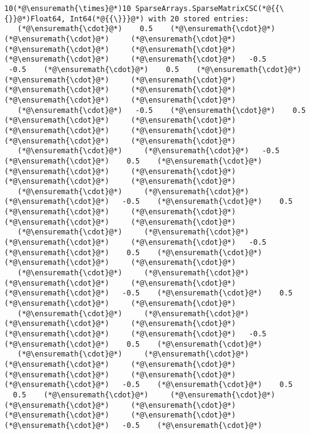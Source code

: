\documentclass[12pt,landscape]{article}
\begin{document}
{\begin{lstlisting}
10(*@\ensuremath{\times}@*)10 SparseArrays.SparseMatrixCSC(*@{{\{}}@*)Float64, Int64(*@{{\}}}@*) with 20 stored entries:
   (*@\ensuremath{\cdot}@*)    0.5    (*@\ensuremath{\cdot}@*)     (*@\ensuremath{\cdot}@*)     (*@\ensuremath{\cdot}@*)     (*@\ensuremath{\cdot}@*)     (*@\ensuremath{\cdot}@*)     (*@\ensuremath{\cdot}@*)     (*@\ensuremath{\cdot}@*)   -0.5
 -0.5    (*@\ensuremath{\cdot}@*)    0.5    (*@\ensuremath{\cdot}@*)     (*@\ensuremath{\cdot}@*)     (*@\ensuremath{\cdot}@*)     (*@\ensuremath{\cdot}@*)     (*@\ensuremath{\cdot}@*)     (*@\ensuremath{\cdot}@*)     (*@\ensuremath{\cdot}@*) 
   (*@\ensuremath{\cdot}@*)   -0.5    (*@\ensuremath{\cdot}@*)    0.5    (*@\ensuremath{\cdot}@*)     (*@\ensuremath{\cdot}@*)     (*@\ensuremath{\cdot}@*)     (*@\ensuremath{\cdot}@*)     (*@\ensuremath{\cdot}@*)     (*@\ensuremath{\cdot}@*) 
   (*@\ensuremath{\cdot}@*)     (*@\ensuremath{\cdot}@*)   -0.5    (*@\ensuremath{\cdot}@*)    0.5    (*@\ensuremath{\cdot}@*)     (*@\ensuremath{\cdot}@*)     (*@\ensuremath{\cdot}@*)     (*@\ensuremath{\cdot}@*)     (*@\ensuremath{\cdot}@*) 
   (*@\ensuremath{\cdot}@*)     (*@\ensuremath{\cdot}@*)     (*@\ensuremath{\cdot}@*)   -0.5    (*@\ensuremath{\cdot}@*)    0.5    (*@\ensuremath{\cdot}@*)     (*@\ensuremath{\cdot}@*)     (*@\ensuremath{\cdot}@*)     (*@\ensuremath{\cdot}@*) 
   (*@\ensuremath{\cdot}@*)     (*@\ensuremath{\cdot}@*)     (*@\ensuremath{\cdot}@*)     (*@\ensuremath{\cdot}@*)   -0.5    (*@\ensuremath{\cdot}@*)    0.5    (*@\ensuremath{\cdot}@*)     (*@\ensuremath{\cdot}@*)     (*@\ensuremath{\cdot}@*) 
   (*@\ensuremath{\cdot}@*)     (*@\ensuremath{\cdot}@*)     (*@\ensuremath{\cdot}@*)     (*@\ensuremath{\cdot}@*)     (*@\ensuremath{\cdot}@*)   -0.5    (*@\ensuremath{\cdot}@*)    0.5    (*@\ensuremath{\cdot}@*)     (*@\ensuremath{\cdot}@*) 
   (*@\ensuremath{\cdot}@*)     (*@\ensuremath{\cdot}@*)     (*@\ensuremath{\cdot}@*)     (*@\ensuremath{\cdot}@*)     (*@\ensuremath{\cdot}@*)     (*@\ensuremath{\cdot}@*)   -0.5    (*@\ensuremath{\cdot}@*)    0.5    (*@\ensuremath{\cdot}@*) 
   (*@\ensuremath{\cdot}@*)     (*@\ensuremath{\cdot}@*)     (*@\ensuremath{\cdot}@*)     (*@\ensuremath{\cdot}@*)     (*@\ensuremath{\cdot}@*)     (*@\ensuremath{\cdot}@*)     (*@\ensuremath{\cdot}@*)   -0.5    (*@\ensuremath{\cdot}@*)    0.5
  0.5    (*@\ensuremath{\cdot}@*)     (*@\ensuremath{\cdot}@*)     (*@\ensuremath{\cdot}@*)     (*@\ensuremath{\cdot}@*)     (*@\ensuremath{\cdot}@*)     (*@\ensuremath{\cdot}@*)     (*@\ensuremath{\cdot}@*)   -0.5    (*@\ensuremath{\cdot}@*)
\end{lstlisting}


}
\end{document}

